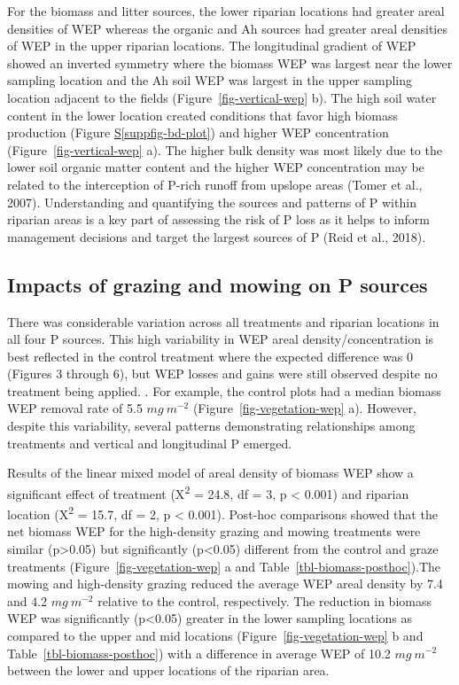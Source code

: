 \documentclass[
]{agujournal2019}
\newcommand*\quartosuppfigref[1]{Figure \hyperref[#1]{S\ref{#1}}}
\begin{document}
For the biomass and litter sources, the lower riparian locations had
greater areal densities of WEP whereas the organic and Ah sources had
greater areal densities of WEP in the upper riparian locations. The
longitudinal gradient of WEP showed an inverted symmetry where the
biomass WEP was largest near the lower sampling location and the Ah soil
WEP was largest in the upper sampling location adjacent to the fields
(Figure~\ref{fig-vertical-wep} b). The high soil water content in the
lower location created conditions that favor high biomass production
(\quartosuppfigref{suppfig-bd-plot}) and higher WEP concentration
(Figure~\ref{fig-vertical-wep} a). The higher bulk density was most
likely due to the lower soil organic matter content and the higher WEP
concentration may be related to the interception of P-rich runoff from
upslope areas (Tomer et al., 2007). Understanding and quantifying the
sources and patterns of P within riparian areas is a key part of
assessing the risk of P loss as it helps to inform management decisions
and target the largest sources of P (Reid et al., 2018).

\subsection{Impacts of grazing and mowing on P
sources}\label{impacts-of-grazing-and-mowing-on-p-sources}

There was considerable variation across all treatments and riparian
locations in all four P sources. This high variability in WEP areal
density/concentration is best reflected in the control treatment where
the expected difference was 0 (Figures 3 through 6), but WEP losses and
gains were still observed despite no treatment being applied. . For
example, the control plots had a median biomass WEP removal rate of 5.5
\(mg~m^{-2}\) (Figure~\ref{fig-vegetation-wep} a). However, despite this
variability, several patterns demonstrating relationships among
treatments and vertical and longitudinal P emerged.

Results of the linear mixed model of areal density of biomass WEP show a
significant effect of treatment (X\textsuperscript{2} = 24.8, df = 3, p
\textless{} 0.001) and riparian location (X\textsuperscript{2} = 15.7,
df = 2, p \textless{} 0.001). Post-hoc comparisons showed that the net
biomass WEP for the high-density grazing and mowing treatments were
similar (p\textgreater0.05) but significantly (p\textless0.05) different
from the control and graze treatments (Figure~\ref{fig-vegetation-wep} a
and Table~\ref{tbl-biomass-posthoc}).The mowing and high-density grazing
reduced the average WEP areal density by 7.4 and 4.2 \(mg~m^{-2}\)
relative to the control, respectively. The reduction in biomass WEP was
significantly (p\textless0.05) greater in the lower sampling locations
as compared to the upper and mid locations
(Figure~\ref{fig-vegetation-wep} b and Table~\ref{tbl-biomass-posthoc})
with a difference in average WEP of 10.2 \(mg~m^{-2}\) between the lower
and upper locations of the riparian area.
\end{document}
